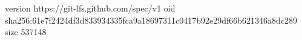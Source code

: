version https://git-lfs.github.com/spec/v1
oid sha256:61e7f2424df3d833934335fca9a18697311c0417b92e29df66b621346a8dc289
size 537148
